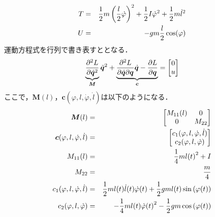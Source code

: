               \begin{eqnarray}
              \equlabel{Tequ}
              T &=& \frac{1}{2} m \left(\frac{l}{2} \dot{\varphi} \right)^2 + \frac{1}{2} I \dot{\varphi}^2 + \frac{1}{2} m \dot{l}^2  \\
              \equlabel{U_equ}
              U &=& -gm\frac{l}{2}\cos(\varphi)
              \end{eqnarray}  
          運動方程式を行列で書き表すととなる．
          \begin{eqnarray}
            \equlabel{Matrix}
            \underbrace{\frac{\partial^2 L}{\partial \dot{\bm{q}}^2}}_{\bm{M}} \ddot{\bm{q}}^2 +\underbrace{\frac{\partial^2 L}{\partial \dot{\bm{q}} \partial \bm{q}} \dot{\bm{q}} - \frac{\partial L}{\partial \bm{q}}}_{\bm{c}} = 
            \begin{bmatrix}
              0 \\
              u \\
              \end{bmatrix}
            \end{eqnarray} 
          ここで，$\bm{M}(l)$，$\bm{c}(\varphi,l,\dot{\varphi},\dot{l})$は以下のようになる．
            \begin{eqnarray}
              \equlabel{M}
              \bm{M}(l)&=&
              \begin{bmatrix}
                M_{11}(l) & 0\\
                0 & M_{22} \\
                \end{bmatrix}\\
              \equlabel{C}
              \bm{c}(\varphi,l,\dot{\varphi},\dot{l})&=&
              \begin{bmatrix}
                c_{1}(\varphi,l,\dot{\varphi},\dot{l}) \\
                c_{2}(\varphi,l,\dot{\varphi}) \\
                \end{bmatrix}\\
              \equlabel{M11}
              M_{11}(l) &=& \frac{1}{4}m{l(t)}^2 + I\\
              \equlabel{M22}
              M_{22} &=& \frac{m}{4}\\
              \equlabel{C1}
              c_{1}(\varphi,l,\dot{\varphi},\dot{l}) &=& \frac{1}{2}ml(t)\dot{l}(t)\dot{\varphi}(t) + \frac{1}{2}gml(t)\sin{(\varphi(t))}\\
              \equlabel{C2}
              c_{2}(\varphi,l,\dot{\varphi}) &=& -\frac{1}{4}ml(t){\dot{\varphi}(t)}^2 - \frac{1}{2}gm\cos{(\varphi(t))}
            \end{eqnarray} 
